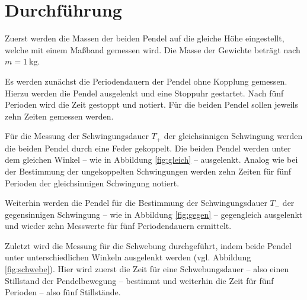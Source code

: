 \section{Durchführung}
\FloatBarrier
\label{sec:Durchführung}
Zuerst werden die Massen der beiden Pendel auf die gleiche Höhe eingestellt, welche mit 
einem Maßband gemessen wird. Die Masse der Gewichte beträgt nach \cite{Anleitung}
$m = \SI{1}{\kilo\gram}$. 

Es werden zunächst die Periodendauern der Pendel ohne Kopplung gemessen.
Hierzu werden die Pendel ausgelenkt und eine Stoppuhr gestartet.
Nach fünf Perioden wird die Zeit gestoppt und notiert.
Für die beiden Pendel sollen jeweils zehn Zeiten gemessen werden.

Für die Messung der Schwingungsdauer $T_+$ der gleichsinnigen Schwingung werden die beiden 
Pendel durch eine Feder gekoppelt. Die beiden Pendel werden unter dem gleichen 
Winkel -- wie in Abbildung \ref{fig:gleich} -- ausgelenkt. Analog 
wie bei der Bestimmung der ungekoppelten Schwingungen werden zehn Zeiten für fünf
Perioden der gleichsinnigen Schwingung notiert.

Weiterhin werden die Pendel für die Bestimmung der Schwingungsdauer $T_-$ der gegensinnigen 
Schwingung -- wie in Abbildung \ref{fig:gegen} -- gegengleich ausgelenkt und wieder zehn 
Messwerte für fünf Periodendauern ermittelt.

Zuletzt wird die Messung für die Schwebung durchgeführt, indem beide Pendel unter 
unterschiedlichen Winkeln ausgelenkt werden (vgl. Abbildung \ref{fig:schwebe}).
Hier wird zuerst die Zeit für eine Schwebungsdauer -- also einen Stillstand der 
Pendelbewegung -- bestimmt und weiterhin die Zeit für fünf Perioden -- also 
fünf Stillstände.

